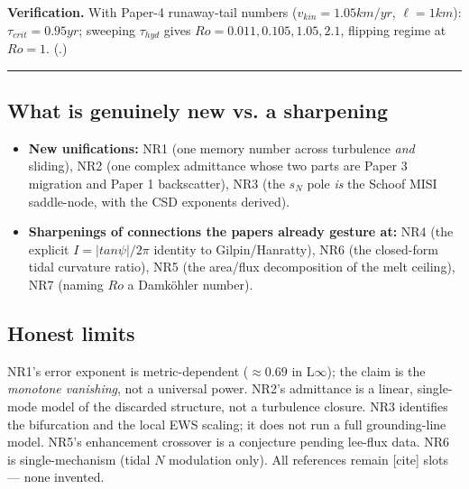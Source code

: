 \documentclass[11pt]{article}
\newcommand{\cmarke}{{\footnotesize\textsf{\textcolor{cLit}{[cite]}}}}
\begin{document}
\textbf{Verification.} With Paper-4 runaway-tail numbers ($v_{kin}=1.05 km/yr$, $\ell =1 km$): $\tau _{crit}=0.95 yr$; sweeping $\tau _{hyd}$ gives $Ro=0.011,0.105,1.05,2.1$, flipping regime at $Ro=1$. (.)


\medskip\hrule\medskip


\subsection*{What is genuinely new vs. a sharpening}


\begin{itemize}
\item \textbf{New unifications:} NR1 (one memory number across turbulence \emph{and} sliding), NR2 (one complex admittance whose two parts are Paper 3 migration and Paper 1 backscatter), NR3 (the $s_{N}$ pole \emph{is} the Schoof MISI saddle-node, with the CSD exponents derived).
\item \textbf{Sharpenings of connections the papers already gesture at:} NR4 (the explicit $I=|tan \psi |/2\pi $ identity to Gilpin/Hanratty), NR6 (the closed-form tidal curvature ratio), NR5 (the area/flux decomposition of the melt ceiling), NR7 (naming $Ro$ a Damköhler number).
\end{itemize}


\subsection*{Honest limits}


NR1's error exponent is metric-dependent ($\approx 0.69$ in L\ensuremath{\infty}); the claim is the \emph{monotone vanishing}, not a universal power. NR2's admittance is a linear, single-mode model of the discarded structure, not a turbulence closure. NR3 identifies the bifurcation and the local EWS scaling; it does not run a full grounding-line model. NR5's enhancement crossover is a conjecture pending lee-flux data. NR6 is single-mechanism (tidal $N$ modulation only). All references remain \cmarke{} slots — none invented.
\end{document}
